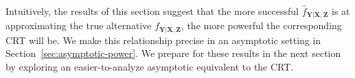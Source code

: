 \documentclass[12pt]{article}
\theoremstyle{definition}
\theoremstyle{remark}
\newcommand{\prx}{\bm X}
\newcommand{\prz}{\bm Z}
\newcommand{\pry}{{\bm Y}}
\begin{document}
%

\paragraph*{}
Intuitively, the results of this section suggest that the more successful $\widehat f_{\pry|\prx,\prz}$ is at approximating the true alternative $f_{\pry|\prx,\prz}$, the more powerful the corresponding CRT will be. We make this relationship precise in an asymptotic setting in Section~\ref{sec:asymptotic-power}. We prepare for these results in the next section by exploring an easier-to-analyze asymptotic equivalent to the CRT.
\end{document}
